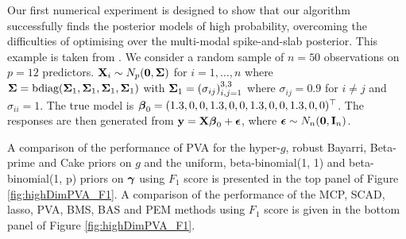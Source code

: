 Our first numerical experiment is designed to show that our algorithm
successfully finds the posterior models of high probability, overcoming the
difficulties of optimising over the multi-modal spike-and-slab posterior.  This
example is taken from \citep{Rockova2017}.  We consider a random sample of $n =
50$ observations on $p = 12$ predictors. ${\bf X}_i \sim N_p({\bf 0}, {\boldsymbol \Sigma})$ for
$i = 1, \ldots, n$ where ${\boldsymbol \Sigma} = \text{bdiag}({\boldsymbol \Sigma}_1, {\boldsymbol \Sigma}_1,
{\boldsymbol \Sigma}_1, {\boldsymbol \Sigma}_1)$ with ${\boldsymbol \Sigma}_1 = (\sigma_{ij})_{i, j = 1}^{3, 3}$ where
$\sigma_{ij} = 0.9$ for $i \ne j$ and $\sigma_{ii} = 1$.  The true model is
${\boldsymbol \beta}_0 = (1.3, 0, 0, 1.3, 0, 0, 1.3, 0, 0, 1.3, 0, 0)^\top$.  The responses
are then generated from ${\bf y} = {\bf X} {\boldsymbol \beta}_0 + {\boldsymbol \epsilon}$, where ${\boldsymbol \epsilon} \sim
N_n({\bf 0}, {\bf I}_n)$.

A comparison of the performance of PVA for the hyper-$g$, robust Bayarri,
Beta-prime and Cake priors on $g$ and the uniform, beta-binomial(1, 1) and
beta-binomial(1, p) priors on ${\boldsymbol \gamma}$ using $F_1$ score is presented in
the top panel of
Figure \ref{fig:highDimPVA_F1}. A comparison of the performance of the MCP,
SCAD, lasso, PVA, BMS, BAS and PEM  methods using $F_1$ score is given in
the bottom panel of Figure \ref{fig:highDimPVA_F1}.

